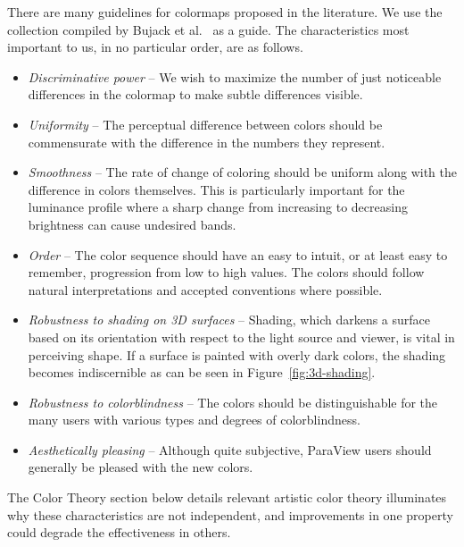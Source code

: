 \documentclass{IEEEcsmag}
\begin{document}
There are many guidelines for colormaps proposed in the literature. We use the collection compiled by Bujack et al.~\cite{Bujack2018} as a guide. The characteristics most important to us, in no particular order, are as follows.

\begin{itemize}
    
\item \emph{Discriminative power} --
  We wish to maximize the number of just noticeable differences in the colormap to make subtle differences visible.
\item \emph{Uniformity} --
  The perceptual difference between colors should be commensurate with the difference in the numbers they represent.
\item \emph{Smoothness} --
  The rate of change of coloring should be uniform along with the difference in colors themselves.
  This is particularly important for the luminance profile where a sharp change from increasing to decreasing brightness can cause undesired bands.
\item \emph{Order} --
  The color sequence should have an easy to intuit, or at least easy to remember, progression from low to high values.
  The colors should follow natural interpretations and accepted conventions where possible.
\item \emph{Robustness to shading on 3D surfaces} -- Shading, which darkens a surface based on its orientation with respect to the light source and viewer, is vital in perceiving shape.
  If a surface is painted with overly dark colors, the shading becomes indiscernible as can be seen in Figure~\ref{fig:3d-shading}.
\item \emph{Robustness to colorblindness} --
  The colors should be distinguishable for the many users with various types and degrees of colorblindness.
\item \emph{Aesthetically pleasing} --
  Although quite subjective, ParaView users should generally be pleased with the new colors.

\end{itemize}

The Color Theory section below details relevant artistic color theory illuminates why these characteristics are not independent, and improvements in one property could degrade the effectiveness in others. 

\end{document}
